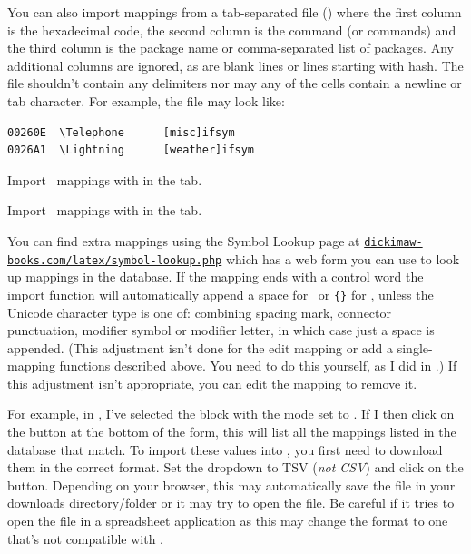You can also import mappings from a tab-separated file ()
where the first column is the hexadecimal code, the second column is
the command (or commands) and the third column is the package name
or comma-separated list of packages. Any additional columns are
ignored, as are blank lines or lines starting with \gls{hash}. The file
shouldn't contain any delimiters nor may any of
the cells contain a newline or tab character. For example,
the file may look like:
\begin{verbatim}
00260E  \Telephone      [misc]ifsym
0026A1  \Lightning      [weather]ifsym
\end{verbatim}

Import \textmode\ mappings with 
in the  tab.

Import \mathsmode\ mappings with 
in the  tab.

You can find extra mappings using the Symbol Lookup page at
\href{http://www.dickimaw-books.com/latex/symbol-lookup.php}{\nolinkurl{dickimaw-books.com/latex/symbol-lookup.php}} which
has a web form you can use to look up mappings in the database.  If
the mapping ends with a control word the import function will
automatically append a space for \mathsmode\ or
\verb|{}| for \textmode, unless the Unicode character type is one
of: combining spacing mark, connector punctuation, modifier symbol
or modifier letter, in which case just a space is appended.
(This adjustment isn't done for the edit mapping or
add a single-mapping functions described above. You need to do this
yourself, as I did in .) If this
adjustment isn't appropriate, you can edit the mapping to remove it.

For example, in , I've selected the
 block with the mode set to . If I
then click on the  button at the bottom of the form, this
will list all the mappings listed in the database that match. To
import these values into \FlowframTk, you first need to download
them in the correct format. Set the 
\gls{dropdown} to TSV (\emph{not CSV}) and click on the
 button. Depending on your browser, this may
automatically save the file  in your
downloads directory\slash folder or it may try to open the file.
Be careful if it tries to open the file in a spreadsheet application
as this may change the format to one that's not compatible with
\FlowframTk.

